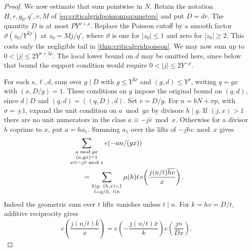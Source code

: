 \documentclass[11pt,a4paper]{article}
\numberwithin{equation}{section}
\begin{document}
\begin{proof}
We now estimate that sum pointwise in $N$. Retain the
notation $H,r,g_0,q',v,M$ of
\cref{eq:criticalgridpoissonparameters} and put $D=dr$.
The quantity $D$ is at most $P Y^{\nu+\rho}$.
Replace the Poisson cutoff by a smooth factor
$\vartheta(z_0/Y^{2\rho})$ at $z_0=M j/q'$, where
$\vartheta$ is one for $|z_0|\le1$ and zero for $|z_0|\ge2$.
This costs only the negligible tail in
\cref{thm:criticalgridpoisson}. We may now sum up to
$0<|j|\le 2Y^{\nu+3\rho}$. The local lower bound on $d$
may be omitted here, since below that bound the support
condition would require $0<|j|\le2Y^{-\rho}$.

For each $s,\ell,d$, sum over $g\mid D$ with
$g\le Y^{2\rho}$ and $(g,d)\le Y^\rho$, writing
$q=g x$ with $(x,D/g)=1$. These conditions on $g$
impose the original bound on $(q,d)$, since $d\mid D$
and $(q,d)=((q,D),d)$. Set $v=D/g$.
For $n=bN+\sigma p$, with $\sigma=\pm1$, expand the
unit condition on $a\bmod gx$ by divisors $h\mid g$.
If $(j,x)>1$ there are no unit numerators in the
class $a\equiv-j\bar v\bmod x$. Otherwise for a divisor
$h$ coprime to $x$, put $a=h a_1$. Summing $a_1$ over the
lifts of $-j\overline{h v}\bmod x$ gives
\begin{align}
 &\sum_{\substack{a\bmod gx\\(a,gx)=1\\a\equiv-j\bar v\bmod x}}
                 e(-an/(gx)) \notag\\
 &\qquad=
 \sum_{\substack{h\mid g,\ (h,x)=1\\t=g/h,\ t\mid n}}
             \mu(h)t\,e\!\left(\frac{j(n/t)\overline{h v}}{x}\right).
 \label{eq:criticalgridflatlifts}
\end{align}
Indeed the geometric sum over $t$ lifts vanishes unless
$t\mid n$. For $k=h v=D/t$, additive reciprocity gives
\[
 e\!\left(\frac{j(n/t)\bar k}{x}\right)
  = e\!\left(-\frac{j(n/t)\bar x}{k}\right)
    e\!\left(\frac{j n}{D x}\right).
\]


\end{proof}
\end{document}
